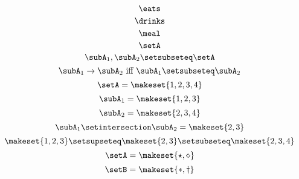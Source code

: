 {\begin{forslides}
\begin{equation}
        \end{equation}
        \begin{equation}
            \label{eq:prod-slides-10}
            \eats
        \end{equation}
        \begin{equation}
            \label{eq:prod-slides-11}
            \drinks
        \end{equation}
        \begin{equation}
            \label{eq:prod-slides-12}
            \meal
        \end{equation}
        \begin{equation}
            \label{eq:prod-slides-13}
            \setA
        \end{equation}
        \begin{equation}
            \label{eq:prod-slides-14}
            \subA_1, \subA_2 \setsubseteq \setA
        \end{equation}
        \begin{equation}
            \label{eq:prod-slides-15}
            \subA_1 \to \subA_2 \text{ iff } \subA_1 \setsubseteq \subA_2
        \end{equation}
        \begin{equation}
            \label{eq:prod-slides-16}
            \setA = \makeset{ 1, 2, 3, 4 }
        \end{equation}
        \begin{equation}
            \label{eq:prod-slides-17}
            \subA_1 = \makeset{ 1, 2, 3 }
        \end{equation}
        \begin{equation}
            \label{eq:prod-slides-18}
            \subA_2 = \makeset{2, 3, 4 }
        \end{equation}
        \begin{equation}
            \label{eq:prod-slides-19}
            \subA_1 \setintersection \subA_2 = \makeset{2, 3 }
        \end{equation}
        \begin{equation}
            \label{eq:prod-slides-20}
            \makeset{ 1, 2, 3 } \setsupseteq \makeset{2, 3 } \setsubseteq \makeset{2, 3, 4 }
        \end{equation}
        \begin{equation}
            \label{eq:coprod-slides-1}
            \setA=\makeset{\star, \diamond}
        \end{equation}
        \begin{equation}
            \label{eq:coprod-slides-2}
            \setB=\makeset{\ast, \dagger}
        \end{equation}

    \end{forslides}

}